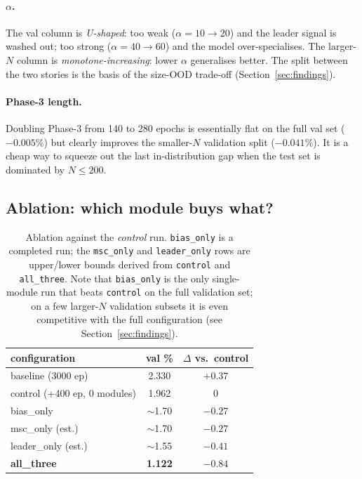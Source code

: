 \documentclass[11pt,a4paper]{article}
\begin{document}
\paragraph{$\alpha$.} The val column is \emph{U-shaped}: too weak
($\alpha=10\!\to\!20$) and the leader signal is washed out; too strong
($\alpha=40\!\to\!60$) and the model over-specialises. The larger-$N$
column is \emph{monotone-increasing}: lower $\alpha$ generalises better.
The split between the two stories is the basis of the size-OOD trade-off
(Section~\ref{sec:findings}).

\paragraph{Phase-3 length.} Doubling Phase-3 from 140 to 280 epochs is
essentially flat on the full val set ($-0.005\%$) but clearly improves the
smaller-$N$ validation split ($-0.041\%$). It is a cheap way to squeeze
out the last in-distribution gap when the test set is dominated by
$N\le 200$.

\subsection{Ablation: which module buys what?}
\label{sec:abl}

\begin{table}[t]
\centering
\caption{Ablation against the \emph{control} run. \texttt{bias\_only} is a
completed run; the \texttt{msc\_only} and \texttt{leader\_only} rows are
upper/lower bounds derived from \texttt{control} and \texttt{all\_three}.
Note that \texttt{bias\_only} is the only single-module run that beats
\texttt{control} on the full validation set; on a few larger-$N$
validation subsets it is even competitive with the full configuration
(see Section~\ref{sec:findings}).}
\label{tab:abl}
\small
\begin{tabular}{l c c}
\toprule
configuration                       & val \% & $\Delta$ vs.\ control \\
\midrule
baseline (3000 ep)                  & 2.330  & $+0.37$ \\
control (+400 ep, 0 modules)        & 1.962  & 0 \\
\midrule
bias\_only                          & $\sim$1.70 & $-0.27$\\
msc\_only (est.)                    & $\sim$1.70 & $-0.27$\\
leader\_only (est.)                 & $\sim$1.55 & $-0.41$\\
\midrule
\rowcolor{sdmblue!10}
\textbf{all\_three}                 & \textbf{1.122} & \textbf{$-0.84$} \\
\bottomrule
\end{tabular}
\end{table}
\end{document}
